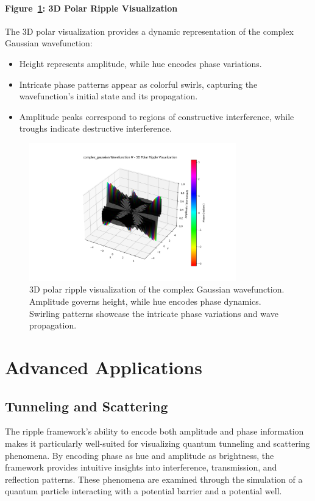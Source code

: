 \documentclass[12pt]{article}
\begin{document}
\paragraph{Figure~\ref{fig:complex_gaussian_3d_polar}: 3D Polar Ripple Visualization}
The 3D polar visualization provides a dynamic representation of the complex Gaussian wavefunction:
\begin{itemize}
    \item Height represents amplitude, while hue encodes phase variations.
    \item Intricate phase patterns appear as colorful swirls, capturing the wavefunction’s initial state and its propagation.
    \item Amplitude peaks correspond to regions of constructive interference, while troughs indicate destructive interference.
\end{itemize}

\begin{figure}[H]
\centering
\includegraphics[width=0.8\textwidth]{images/complex_gaussian_wavefunction_3d_polar_probability_density_with_phase.png}
\caption{3D polar ripple visualization of the complex Gaussian wavefunction. Amplitude governs height, while hue encodes phase dynamics. Swirling patterns showcase the intricate phase variations and wave propagation.}
\label{fig:complex_gaussian_3d_polar}
\end{figure}

\section{Advanced Applications}
\subsection{Tunneling and Scattering}

The ripple framework’s ability to encode both amplitude and phase information makes it particularly well-suited for visualizing quantum tunneling and scattering phenomena. By encoding phase as hue and amplitude as brightness, the framework provides intuitive insights into interference, transmission, and reflection patterns. These phenomena are examined through the simulation of a quantum particle interacting with a potential barrier and a potential well.
\end{document}
